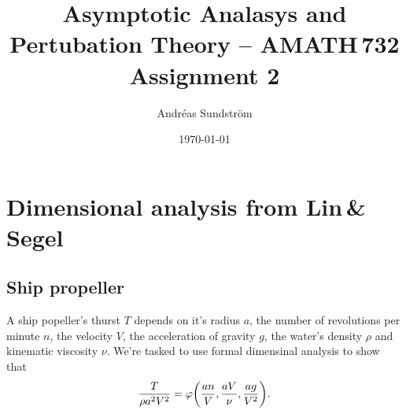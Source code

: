 \documentclass[11pt,letter, swedish, english
]{article}
\begin{document}
\title{Asymptotic Analasys and Pertubation Theory -- AMATH\,732 \\
Assignment 2}
\author{Andréas Sundström}
\date{\today}

\maketitle



\section{Dimensional analysis from Lin\,\&\,Segel}
\setcounter{subsection}{4}
\renewcommand{\thesubsection}{L\&S 6.2: \arabic{subsection}}
\subsection{Ship propeller}
A ship popeller's thurst $T$ depends on it's radius $a$, the number of
revolutions per minute $n$, the velocity $V$, the acceleration of
gravity $g$, the water's density $\rho$ and kinematic viscosity $\nu$.
We're tasked to use formal dimensinal analysis to show that
\begin{equation}
\frac{T}{\rho a^2 V^2} = 
\varphi\qty(\frac{an}{V}, \frac{aV}{\nu}, \frac{ag}{V^2}).
\end{equation}
\end{document}
